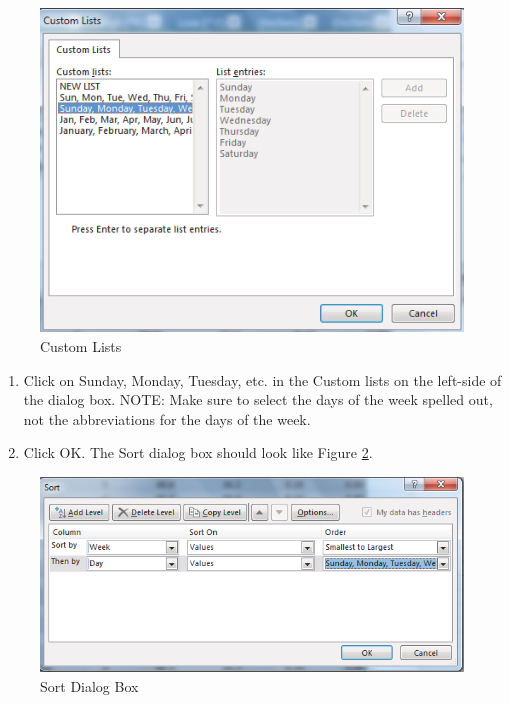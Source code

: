 \begin{figure}[H]
	\centering
	\includegraphics[width=\maxwidth{.95\linewidth}]{gfx/ch05_fig13}
	\caption{Custom Lists}
	\label{05:fig13}
\end{figure}

\begin{enumerate}[resume]
	\item Click on Sunday, Monday, Tuesday, etc. in the Custom lists on the left-side of the dialog box. NOTE: Make sure to select the days of the week spelled out, not the abbreviations for the days of the week.
	\item Click OK. The Sort dialog box should look like Figure \ref{05:fig14}.
\end{enumerate}

\begin{figure}[H]
	\centering
	\includegraphics[width=\maxwidth{.95\linewidth}]{gfx/ch05_fig14}
	\caption{Sort Dialog Box}
	\label{05:fig14}
\end{figure}

